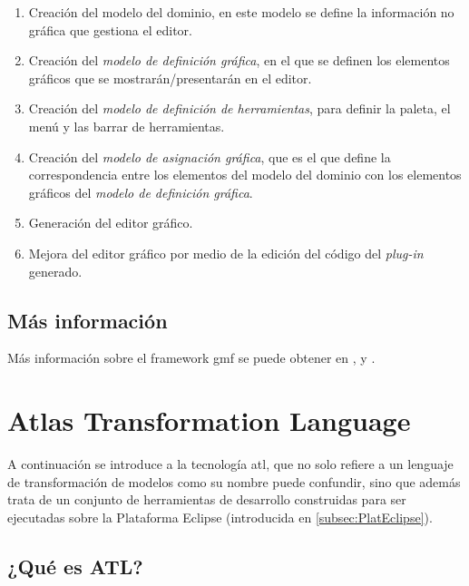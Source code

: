 \documentclass[a4paper,12pt,oneside,spanish]{book}
\begin{document}
\begin{enumerate}


\item Creación del modelo del dominio, en este modelo se define la información no gráfica  que gestiona el editor.

\item Creación del \textit{modelo de definición gráfica}, en el que se definen los elementos gráficos que se mostrarán/presentarán en el editor.

\item Creación del \textit{modelo de definición de herramientas}, para definir la paleta, el menú y las barrar de herramientas.

\item Creación del \textit{modelo de asignación gráfica}, que es el que define la correspondencia entre los elementos del modelo del dominio con los elementos gráficos del \textit{modelo de definición gráfica}.

\item Generación del editor gráfico.

\item Mejora del editor gráfico por medio de la edición del código del \textit{plug-in} generado.

\end{enumerate}


\subsection{Más información}

Más información sobre el framework \gls{gmf} se puede obtener en \cite{GMP}, \cite{IntroGMFRuntime} y \cite{GMFTutorial}.


\section{Atlas Transformation Language}

A continuación se introduce a la tecnología \gls{atl}, que no solo refiere a un lenguaje de transformación de modelos como su nombre puede confundir, sino que además trata de un conjunto de herramientas de desarrollo construidas para ser ejecutadas sobre la Plataforma \textsf{Eclipse} (introducida en \ref{subsec:PlatEclipse}).


\subsection{¿Qué es ATL?}
\end{document}
